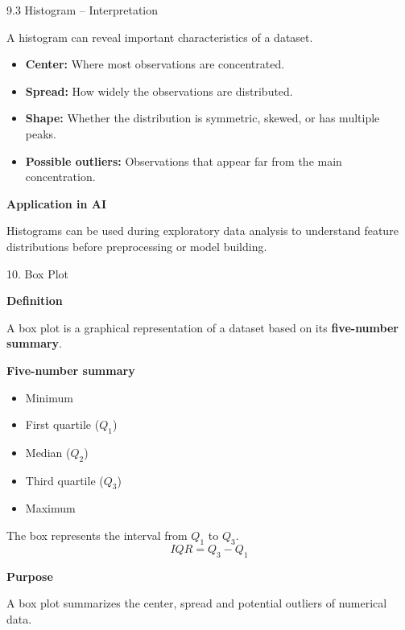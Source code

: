 
\begin{frame}{9.3 Histogram -- Interpretation}

A histogram can reveal important characteristics of a dataset.

\vspace{0.3cm}

\begin{itemize}
    \item \textbf{Center:} Where most observations are concentrated.
    
    \item \textbf{Spread:} How widely the observations are distributed.
    
    \item \textbf{Shape:} Whether the distribution is symmetric,
    skewed, or has multiple peaks.
    
    \item \textbf{Possible outliers:} Observations that appear
    far from the main concentration.
\end{itemize}

\vspace{0.4cm}

\textbf{Application in AI}

Histograms can be used during exploratory data analysis to
understand feature distributions before preprocessing or
model building.

\end{frame}



\begin{frame}{10. Box Plot}

\textbf{Definition}

A box plot is a graphical representation of a dataset based on
its \textbf{five-number summary}.

\vspace{0.1cm}

\textbf{Five-number summary}

\begin{itemize}
    \item Minimum
    \item First quartile ($Q_1$)
    \item Median ($Q_2$)
    \item Third quartile ($Q_3$)
    \item Maximum
\end{itemize}

The box represents the interval from $Q_1$ to $Q_3$.
\[
\boxed{IQR=Q_3-Q_1}
\]

\vspace{0.1cm}

\textbf{Purpose}

A box plot summarizes the center, spread and potential
outliers of numerical data.

\end{frame}


